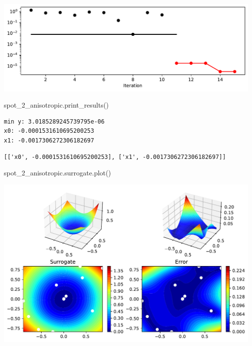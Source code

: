 \documentclass[
  letterpaper,
  DIV=11,
  numbers=noendperiod]{scrreprt}
\newenvironment{Shaded}{\begin{snugshade}}{\end{snugshade}}
\newcommand{\NormalTok}[1]{\textcolor[rgb]{0.00,0.23,0.31}{#1}}
\begin{document}
\includegraphics{009_num_spot_anisotropic_files/figure-pdf/cell-9-output-1.pdf}

\begin{Shaded}
\begin{Highlighting}[]
\NormalTok{spot\_2\_anisotropic.print\_results()}
\end{Highlighting}
\end{Shaded}

\begin{verbatim}
min y: 3.0185289245739795e-06
x0: -0.0001531610695200253
x1: -0.0017306272306182697
\end{verbatim}

\begin{verbatim}
[['x0', -0.0001531610695200253], ['x1', -0.0017306272306182697]]
\end{verbatim}

\begin{Shaded}
\begin{Highlighting}[]
\NormalTok{spot\_2\_anisotropic.surrogate.plot()}
\end{Highlighting}
\end{Shaded}

\includegraphics{009_num_spot_anisotropic_files/figure-pdf/cell-11-output-1.pdf}
\end{document}
